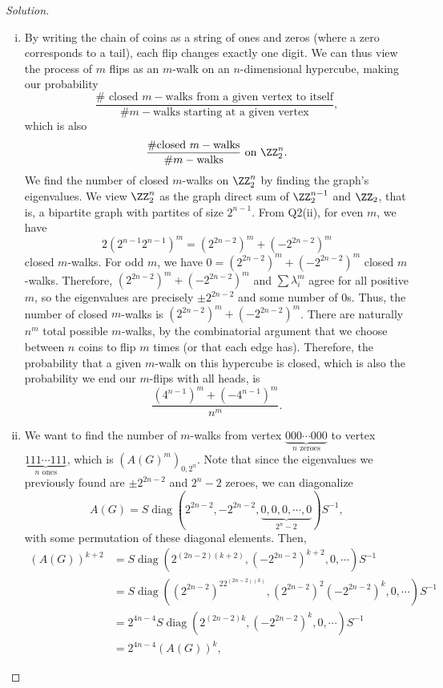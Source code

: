 \documentclass[11pt]{scrartcl}
\begin{document}
\begin{proof}[Solution]
\begin{enumerate}[(i)]
    \item By writing the chain of coins as a string of ones and zeros (where a zero corresponds to a tail), each flip changes exactly one digit. We can thus view the process of $m$ flips as an $m$-walk on an $n$-dimensional hypercube, making our probability \[\frac{\#\text{ closed }m-\text{walks from a given vertex to itself}}{\#m-\text{walks starting at a given vertex}},\]which is also \[\frac{\#\text{closed }m-\text{walks}}{\#m-\text{walks}}\text{ on }\ZZ_2^n.\] We find the number of closed $m$-walks on $\ZZ_2^n$ by finding the graph's eigenvalues. We view $\ZZ_2^n$ as the graph direct sum of $\ZZ_2^{n-1}$ and $\ZZ_2$, that is, a bipartite graph with partites of size $2^{n-1}$. From Q2(ii), for even $m$, we have \[2(2^{n-1}2^{n-1})^m=(2^{2n-2})^m+(-2^{2n-2})^m\] closed $m$-walks. For odd $m$, we have $0=(2^{2n-2})^m+(-2^{2n-2})^m$ closed $m$-walks. Therefore, $(2^{2n-2})^m+(-2^{2n-2})^m$ and $\sum\lambda_i^m$ agree for all positive $m$, so the eigenvalues are precisely $\pm2^{2n-2}$ and some number of $0$s. Thus, the number of closed $m$-walks is $(2^{2n-2})^m+(-2^{2n-2})^m$. There are naturally $n^m$ total possible $m$-walks,  by the combinatorial argument that we choose between $n$ coins to flip $m$ times (or that each edge has). Therefore, the probability that a given $m$-walk on this hypercube is closed, which is also the probability we end our $m$-flips with all heads, is \[\boxed{\frac{(4^{n-1})^m+(-4^{n-1})^m}{n^m}}.\]
    \item We want to find the number of $m$-walks from vertex $\underbrace{000\cdots000}_{n\text{ zeroes}}$ to vertex $\underbrace{111\cdots111}_{n\text{ ones}}$, which is $(A(G)^m)_{0,2^n}$. Note that since the eigenvalues we previously found are $\pm2^{2n-2}$ and $2^{n}-2$ zeroes, we can diagonalize \[A(G)=S\mathop{\mathrm{diag}}(2^{2n-2},-2^{2n-2},\underbrace{0,0,0,\cdots,0}_{2^n-2})S^{-1},\] with some permutation of these diagonal elements. Then, 
    \begin{align*}
        (A(G))^{k+2}&=S\mathop{\mathrm{diag}}(2^{(2n-2)(k+2)},(-2^{2n-2})^{k+2},0,\cdots)S^{-1}\\
        &=S\mathop{\mathrm{diag}}((2^{2n-2})^22^{(2n-2)(k)},(2^{2n-2})^2(-2^{2n-2})^{k},0,\cdots)S^{-1}\\
        &=2^{4n-4}S\mathop{\mathrm{diag}}(2^{(2n-2)k},(-2^{2n-2})^{k},0,\cdots)S^{-1}\\
        &=2^{4n-4}(A(G))^k,

\end{align*}
\end{enumerate}
\end{proof}
\end{document}
